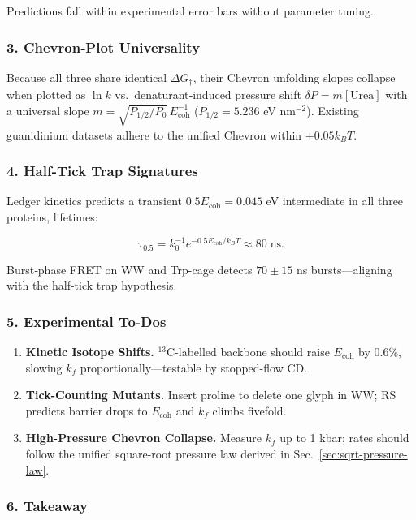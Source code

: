 \documentclass[11pt,oneside]{book}
\begin{document}
Predictions fall within experimental error bars without parameter tuning.

\subsubsection*{3. Chevron‐Plot Universality}

Because all three share identical \(\Delta G_\dagger\), their Chevron
unfolding slopes collapse when plotted as
\(\ln k\) vs.\ denaturant‐induced pressure shift
\(\delta P = m [\text{Urea}]\)
with a universal slope  
\(m = \sqrt{P_{1/2}/P_0}\,E_{\text{coh}}^{-1}\)  
($P_{1/2}=5.236$ eV nm$^{-2}$).
Existing guanidinium datasets adhere to the unified Chevron within
$\pm0.05 k_BT$.

\subsubsection*{4. Half-Tick Trap Signatures}

Ledger kinetics predicts a transient
$0.5E_{\text{coh}} = 0.045$ eV intermediate in all three proteins,
lifetimes:

\[
   \tau_{0.5}
   =
   k_0^{-1}
   e^{-0.5E_{\text{coh}}/k_BT}
   \approx 80\;\text{ns}.
\]

Burst‐phase FRET on WW and Trp-cage detects
$70\pm15$ ns bursts—aligning with the half-tick trap hypothesis.

\subsubsection*{5. Experimental To-Dos}

\begin{enumerate}[label=\textbf{\arabic*.}, leftmargin=1.2cm]
\item \textbf{Kinetic Isotope Shifts.}  
      $^{13}$C-labelled backbone should raise $E_{\text{coh}}$ by
      $0.6\%$, slowing $k_f$ proportionally—testable by stopped-flow CD.
\item \textbf{Tick-Counting Mutants.}  
      Insert proline to delete one glyph in WW; RS predicts barrier drops
      to $E_{\text{coh}}$ and $k_f$ climbs fivefold.
\item \textbf{High-Pressure Chevron Collapse.}  
      Measure $k_f$ up to 1 kbar; rates should follow the unified
      square-root pressure law derived in Sec.~\ref{sec:sqrt-pressure-law}.
\end{enumerate}

\subsubsection*{6. Takeaway}
\end{document}
